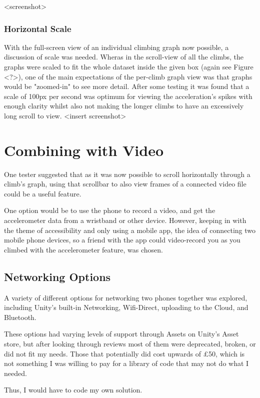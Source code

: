 <screenshot>



\subsubsection{Horizontal Scale}
With the full-screen view of an individual climbing graph now possible, a discussion of scale was needed. 
Wheras in the scroll-view of all the climbs, the graphs were scaled to fit the whole dataset inside the given box (again see Figure <?>), one of the main expectations of the per-climb graph view was that graphs would be "zoomed-in" to see more detail.
After some testing it was found that a scale of 100px per second was optimum for viewing the acceleration's spikes with enough clarity whilst also not making the longer climbs to have an excessively long scroll to view. 
<insert screenshot>


\section{Combining with Video}
One tester suggested that as it was now possible to scroll horizontally through a climb's graph, using that scrollbar to also view frames of a connected video file could be a useful feature.

One option would be to use the phone to record a video, and get the accelerometer data from a wristband or other device.
However, keeping in with the theme of accessibility and only using a mobile app, the idea of connecting two mobile phone devices, so a friend with the app could video-record you as you climbed with the accelerometer feature, was chosen.




\subsection{Networking Options}
A variety of different options for networking two phones together was explored, including Unity's built-in Networking, Wifi-Direct, uploading to the Cloud, and Bluetooth.


These options had varying levels of support through Assets on Unity's Asset store, but after looking through reviews most of them were deprecated, broken, or did not fit my needs.
Those that potentially did cost upwards of \pounds50, which is not something I was willing to pay for a library of code that may not do what I needed.

Thus, I would have to code my own solution.


